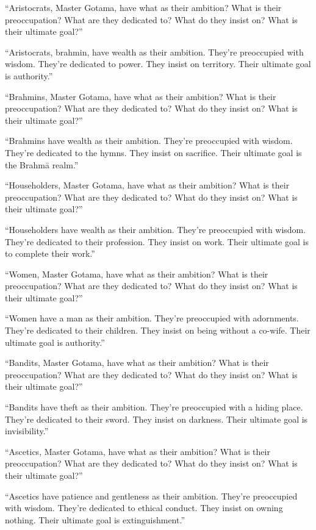 \documentclass[12pt,openany]{book}%
\begin{document}
“Aristocrats, Master Gotama, have what as their ambition? What is their preoccupation? What are they dedicated to? What do they insist on? What is their ultimate goal?” 

“Aristocrats, brahmin, have wealth as their ambition. They’re preoccupied with wisdom. They’re dedicated to power. They insist on territory. Their ultimate goal is authority.” 

“Brahmins, Master Gotama, have what as their ambition? What is their preoccupation? What are they dedicated to? What do they insist on? What is their ultimate goal?” 

“Brahmins have wealth as their ambition. They’re preoccupied with wisdom. They’re dedicated to the hymns. They insist on sacrifice. Their ultimate goal is the \textsanskrit{Brahmā} realm.” 

“Householders, Master Gotama, have what as their ambition? What is their preoccupation? What are they dedicated to? What do they insist on? What is their ultimate goal?” 

“Householders have wealth as their ambition. They’re preoccupied with wisdom. They’re dedicated to their profession. They insist on work. Their ultimate goal is to complete their work.” 

“Women, Master Gotama, have what as their ambition? What is their preoccupation? What are they dedicated to? What do they insist on? What is their ultimate goal?” 

“Women have a man as their ambition. They’re preoccupied with adornments. They’re dedicated to their children. They insist on being without a co-wife. Their ultimate goal is authority.” 

“Bandits, Master Gotama, have what as their ambition? What is their preoccupation? What are they dedicated to? What do they insist on? What is their ultimate goal?” 

“Bandits have theft as their ambition. They’re preoccupied with a hiding place. They’re dedicated to their sword. They insist on darkness. Their ultimate goal is invisibility.” 

“Ascetics, Master Gotama, have what as their ambition? What is their preoccupation? What are they dedicated to? What do they insist on? What is their ultimate goal?” 

“Ascetics have patience and gentleness as their ambition. They’re preoccupied with wisdom. They’re dedicated to ethical conduct. They insist on owning nothing. Their ultimate goal is extinguishment.” 
\end{document}
